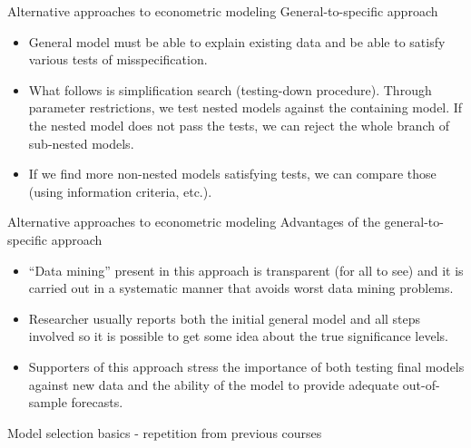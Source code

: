 \documentclass{beamer}
\begin{document}
\begin{frame}{Alternative approaches to econometric modeling}
General-to-specific approach\\
\vspace{0.3cm}
\begin{itemize}
\item General model must be able to explain existing data and be able to satisfy various tests of misspecification.
\vspace{0.3cm}
\item What follows is simplification search (testing-down procedure). Through parameter restrictions, we test nested models against the containing model. If the nested model does not pass the tests, we can reject the whole branch of sub-nested models.
\vspace{0.3cm}
\item If we find more non-nested models satisfying tests, we can compare those (using information criteria, etc.).
\end{itemize}
\end{frame}
\begin{frame}{Alternative approaches to econometric modeling}
Advantages of the general-to-specific approach\\
\vspace{0.3cm}
\begin{itemize}
\item ``Data mining''  present in this approach is transparent (for all to see) and it is carried out in a systematic manner that avoids worst data mining problems. 
\vspace{0.3cm}
\item Researcher usually reports both the initial general model and all steps involved so it is possible to get some idea about the true significance levels.
\vspace{0.3cm}
\item Supporters of this approach stress the importance of both testing final models against new data and the ability of the model to provide adequate out-of-sample forecasts.
\end{itemize}
\end{frame}
\begin{frame}{Model selection basics - repetition from previous courses}
\end{frame}
\end{document}
